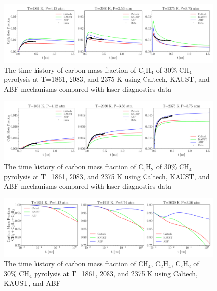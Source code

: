  \begin{figure}[H]
	\centering
	\includegraphics[width=1\textwidth]{Figures/Results/Shocktube/Stanford/june/30CH4_C2H4_mechs_nosoot_subset.pdf}
	\caption{The time history of carbon mass fraction of $\mathrm{C_2H_4}$ of 30\% $\mathrm{CH_4}$ pyrolysis at T=1861, 2083, and 2375 K using Caltech, KAUST, and ABF mechanisms compared with laser diagnostics data}
	\label{fig:shocktubest_30ch4_c2h4_nosoot_subset} 
\end{figure}

 \begin{figure}[H]
	\centering
	\includegraphics[width=1\textwidth]{Figures/Results/Shocktube/Stanford/june/30CH4_C2H2_mechs_nosoot_subset.pdf}
	\caption{The time history of carbon mass fraction of $\mathrm{C_2H_2}$ of 30\% $\mathrm{CH_4}$ pyrolysis at T=1861, 2083, and 2375 K using Caltech, KAUST, and ABF mechanisms compared with laser diagnostics data}
	\label{fig:shocktubest_30ch4_c2h2_nosoot_subset} 
\end{figure}
 
 
\begin{figure}[H]
	\centering
	\includegraphics[width=1\textwidth]{Figures/Results/Shocktube/Stanford/june/30CH4_CCC_mechs_nosoot_subset.pdf}
	\caption{The time history of carbon mass fraction of $\mathrm{CH_4}$, $\mathrm{C_2H_4}$, $\mathrm{C_2H_2}$ of 30\% $\mathrm{CH_4}$ pyrolysis at T=1861, 2083, and 2375 K using Caltech, KAUST, and ABF}
	\label{fig:shocktubest_30ch4_ccc_nosoot_subset} 
\end{figure}
 

